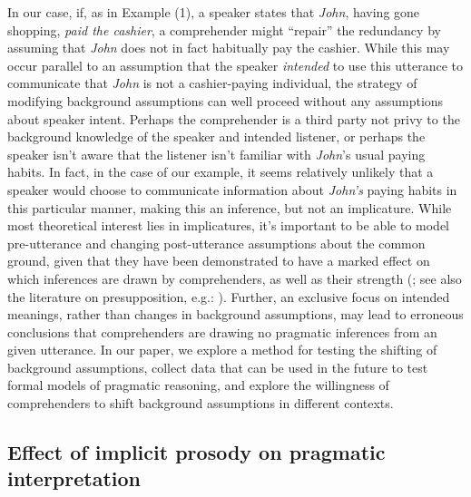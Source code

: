 In our case, if, as in Example (1), a speaker states that \emph{John},
having gone shopping, \emph{paid the cashier}, a comprehender might
\enquote{repair} the redundancy by assuming that \emph{John} does not in
fact habitually pay the cashier. While this may occur parallel to an
assumption that the speaker \emph{intended} to use this utterance to
communicate that \emph{John} is not a cashier-paying individual, the
strategy of modifying background assumptions can well proceed without
any assumptions about speaker intent. Perhaps the comprehender is a
third party not privy to the background knowledge of the speaker and
intended listener, or perhaps the speaker isn't aware that the listener
isn't familiar with \emph{John}'s usual paying habits. In fact, in the
case of our example, it seems relatively unlikely that a speaker would
choose to communicate information about \emph{John's} paying habits in
this particular manner, making this an inference, but not an
implicature. While most theoretical interest lies in implicatures, it's
important to be able to model pre-utterance and changing post-utterance
assumptions about the common ground, given that they have been
demonstrated to have a marked effect on which inferences are drawn by
comprehenders, as well as their strength (\citealp{Degen2015a}; see also
the literature on presupposition, e.g.: \citealp{Stalnaker1973}). Further, an
exclusive focus on intended meanings, rather than changes in background
assumptions, may lead to erroneous conclusions that comprehenders are
drawing no pragmatic inferences from an given utterance. In our paper,
we explore a method for testing the shifting of background assumptions,
collect data that can be used in the future to test formal models of
pragmatic reasoning, and explore the willingness of comprehenders to
shift background assumptions in different contexts.

\subsection{Effect of implicit prosody on pragmatic
interpretation}\label{effect-of-implicit-prosody-on-pragmatic-interpretation}

